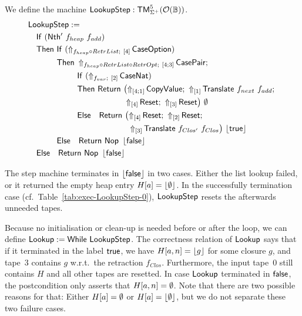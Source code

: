 \begin{definition}
  \label{def:Lookup_Step}
  We define the machine $\mathsf{LookupStep} : \mathsf{TM}_{\Sigma^+}^5(\mathcal{O}(\mathbb{B}))$.
  \begin{align*}
    & \MS{LookupStep} := \\
    & \quad \MS{If}~(\MS{Nth'}~f_{heap}~f_{add}) \\
    & \quad \MS{Then}~\MS{If}~(\LiftBoth{\MS{CaseOption}}{f_{heap} \circ RetrList}{\Vector{4}}) \\
    & \quad \phantom{\MS{Then}}~\MS{Then}~\LiftBoth{\MS{CasePair}}{f_{heap} \circ RetrList \circ RetrOpt}{\Vector{4;3}} \Seq \\
    & \quad \phantom{\MS{Then}~\MS{Then}}~\MS{If}~(\LiftBoth{\MS{CaseNat}}{f_{var}}{\Vector{2}}) \\
    & \quad \phantom{\MS{Then}~\MS{Then}}~\MS{Then}~ \MS{Return}~\bigl(
      \LiftTapes{\MS{CopyValue}}{\Vector{4;1}} \Seq
      \LiftTapes{\MS{Translate}~f_{next}~f_{add}}{\Vector{1}} \Seq \\
    & \quad \phantom{\MS{Then}~\MS{Then}~\MS{Then}~\MS{Return}\bigl(}
      \LiftTapes{\MS{Reset}}{\Vector{4}} \Seq
      \LiftTapes{\MS{Reset}}{\Vector{3}}
      \bigr)~{\None} \\
    & \quad \phantom{\MS{Then}~\MS{Then}}~\MS{Else}~~~ \MS{Return}~\bigl(
      \LiftTapes{\MS{Reset}}{\Vector{4}} \Seq
      \LiftTapes{\MS{Reset}}{\Vector{2}} \Seq \\
    & \quad \phantom{\phantom{\MS{Then}~\MS{Then}}~\MS{Else}~~~\MS{Return}~\bigl(}
      \LiftTapes{\MS{Translate}~f_{Clos'}~f_{Clos}}{\Vector{3}}
      \bigr)~{\Some\true} \\
    & \quad \phantom{\MS{Then}}~\MS{Else}~~~ \Return{\Nop}{\Some\false} \\
    & \quad \MS{Else}~~~ \Return{\Nop}{\Some\false}
  \end{align*}
\end{definition}

The step machine terminates in $\left\lfloor {\ensuremath{\mathsf{false}}} \right\rfloor$ in two cases.  Either the list lookup failed, or it returned the empty heap entry $H[a]=\left\lfloor {\emptyset} \right\rfloor$.  In
the successfully termination case (cf.\ Table~\ref{tab:exec-LookupStep-0}), $\mathsf{LookupStep}$ resets the afterwards unneeded tapes.

Because no initialisation or clean-up is needed before or after the loop, we can define $\mathsf{Lookup} := \mathsf{While}~\mathsf{LookupStep}$.  The correctness
relation of $\mathsf{Lookup}$ says that if it terminated in the label $\mathsf{true}$, we have $H[a,n] = \left\lfloor {g} \right\rfloor$ for some closure $g$, and tape~$3$ contains $g$
w.r.t.\ the retraction $f_{Clos}$.  Furthermore, the input tape~$0$ still contains $H$ and all other tapes are resetted.  In case $\mathsf{Lookup}$
terminated in $\mathsf{false}$, the postcondition only asserts that $H[a,n]=\emptyset$.  Note that there are two possible reasons for that: Either $H[a]=\emptyset$ or
$H[a]=\left\lfloor {\emptyset} \right\rfloor$, but we do not separate these two failure cases.

